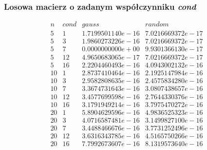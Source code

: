 \subsubsection*{Losowa macierz o zadanym współczynniku \textit{cond}}
$$
\begin{array}{c|c|c|c}
n & \textit{cond} & gauss & random\\
\hline
5 & 1 & 1.7199501140e-16 & 7.0216669372e-17 \\
5 & 3 & 1.9860273226e-16 & 7.0216669372e-17 \\
5 & 7 & 0.0000000000e+00 & 9.9301366130e-17 \\
5 & 12 & 4.9650683065e-17 & 7.0216669372e-17 \\
5 & 16 & 2.2204460493e-16 & 4.0943002132e-16 \\
10 & 1 & 2.8737410464e-16 & 2.1925147984e-16 \\
10 & 3 & 2.9582808635e-16 & 2.4575834280e-16 \\
10 & 7 & 3.3674731643e-16 & 3.0807438657e-16 \\
10 & 12 & 3.4577699598e-16 & 2.7644330376e-16 \\
10 & 16 & 3.1791949214e-16 & 3.7975470272e-16 \\
20 & 1 & 5.8904629596e-16 & 4.9836525323e-16 \\
20 & 3 & 4.0716587481e-16 & 3.1499827100e-16 \\
20 & 7 & 3.4488466676e-16 & 3.7731252496e-16 \\
20 & 12 & 3.6316343785e-16 & 4.5165750266e-16 \\
20 & 16 & 7.7992673607e-16 & 8.1319573640e-16 \\
\end{array}
$$
